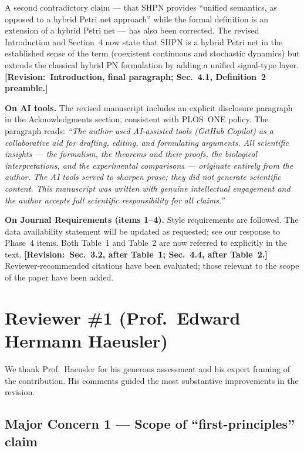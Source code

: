\documentclass[11pt,letterpaper]{article}
\newcommand{\sref}[1]{\textbf{[Revision:~#1]}}
\begin{document}
A second contradictory claim --- that SHPN provides ``unified semantics, as
opposed to a hybrid Petri net approach'' while the formal definition is an
extension of a hybrid Petri net --- has also been corrected. The revised
Introduction and Section~4 now state that SHPN is a hybrid Petri net in
the established sense of the term (coexistent continuous and stochastic
dynamics) but extends the classical hybrid PN formulation by adding a unified
signal-type layer. \sref{Introduction, final paragraph; Sec.~4.1, Definition~2
preamble.}

\textbf{On AI tools.} The revised manuscript includes an explicit disclosure
paragraph in the Acknowledgments section, consistent with PLOS~ONE policy. The
paragraph reads: \textit{``The author used AI-assisted tools (GitHub Copilot)
as a collaborative aid for drafting, editing, and formulating arguments. All
scientific insights --- the formalism, the theorems and their proofs, the
biological interpretations, and the experimental comparisons --- originate
entirely from the author. The AI tools served to sharpen prose; they did not
generate scientific content. This manuscript was written with genuine
intellectual engagement and the author accepts full scientific responsibility
for all claims.''}

\textbf{On Journal Requirements (items 1--4).}
Style requirements are followed.
The data availability statement will be updated as requested; see our response
to Phase~4 items.
Both Table~1 and Table~2 are now referred to explicitly in the text.
\sref{Sec.~3.2, after Table~1; Sec.~4.4, after Table~2.}
Reviewer-recommended citations have been evaluated; those relevant to the
scope of the paper have been added.

\bigskip

\section*{Reviewer \#1 (Prof.\ Edward Hermann Haeusler)}

We thank Prof.\ Haeusler for his generous assessment and his expert framing of
the contribution. His comments guided the most substantive improvements in
the revision.

\subsection*{Major Concern 1 --- Scope of ``first-principles'' claim}
\end{document}
